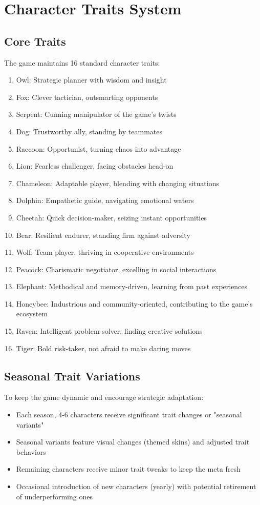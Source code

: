\documentclass[12pt,a4paper]{article}
\begin{document}
\section{Character Traits System}

\subsection{Core Traits}
The game maintains 16 standard character traits:
\begin{enumerate}
    \item Owl: Strategic planner with wisdom and insight
    \item Fox: Clever tactician, outsmarting opponents
    \item Serpent: Cunning manipulator of the game's twists
    \item Dog: Trustworthy ally, standing by teammates
    \item Raccoon: Opportunist, turning chaos into advantage
    \item Lion: Fearless challenger, facing obstacles head-on
    \item Chameleon: Adaptable player, blending with changing situations
    \item Dolphin: Empathetic guide, navigating emotional waters
    \item Cheetah: Quick decision-maker, seizing instant opportunities
    \item Bear: Resilient endurer, standing firm against adversity
    \item Wolf: Team player, thriving in cooperative environments
    \item Peacock: Charismatic negotiator, excelling in social interactions
    \item Elephant: Methodical and memory-driven, learning from past experiences
    \item Honeybee: Industrious and community-oriented, contributing to the game's ecosystem
    \item Raven: Intelligent problem-solver, finding creative solutions
    \item Tiger: Bold risk-taker, not afraid to make daring moves
\end{enumerate}

\subsection{Seasonal Trait Variations}
To keep the game dynamic and encourage strategic adaptation:
\begin{itemize}
    \item Each season, 4-6 characters receive significant trait changes or "seasonal variants"
    \item Seasonal variants feature visual changes (themed skins) and adjusted trait behaviors
    \item Remaining characters receive minor trait tweaks to keep the meta fresh
    \item Occasional introduction of new characters (yearly) with potential retirement of underperforming ones
\end{itemize}
\end{document}
